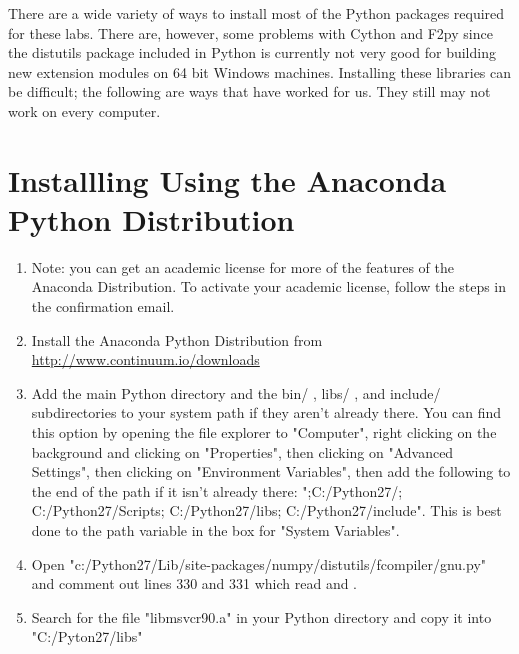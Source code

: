 \label{win64install}


There are a wide variety of ways to install most of the Python packages required for these labs.
There are, however, some problems with Cython and F2py since the distutils package included in Python is currently not very good for building new extension modules on 64 bit Windows machines.
Installing these libraries can be difficult; the following are ways that have worked for us.
They still may not work on every computer.

\section*{Installling Using the Anaconda Python Distribution}
\begin{enumerate}
\item Note: you can get an academic license for more of the features of the Anaconda Distribution.
To activate your academic license, follow the steps in the confirmation email.

\item Install the Anaconda Python Distribution from \url{http://www.continuum.io/downloads}

\item Add the main Python directory and the bin/ , libs/ , and include/ subdirectories to your system path if they aren't already there.
You can find this option by opening the file explorer to "Computer", right clicking on the background and clicking on "Properties", then clicking on "Advanced Settings", then clicking on "Environment Variables", then add the following to the end of the path if it isn't already there: ";C:/Python27/; C:/Python27/Scripts; C:/Python27/libs; C:/Python27/include". This is best done to the path variable in the box for "System Variables".

\item Open "c:/Python27/Lib/site-packages/numpy/distutils/fcompiler/gnu.py" and comment out lines 330 and 331 which read  and .

\item Search for the file "libmsvcr90.a" in your Python directory and copy it into "C:/Pyton27/libs"

\end{enumerate}


